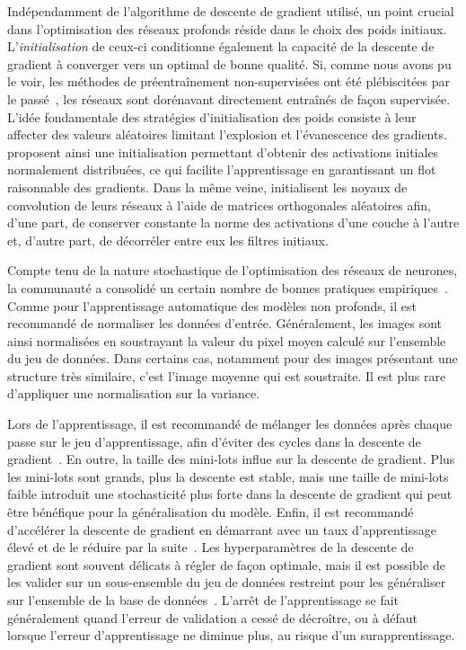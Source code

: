 Indépendamment de l'algorithme de descente de gradient utilisé, un point crucial dans l'optimisation des réseaux profonds réside dans le choix des poids initiaux. L'\emph{initialisation} de ceux-ci conditionne également la capacité de la descente de gradient à converger vers un optimal de bonne qualité. Si, comme nous avons pu le voir, les méthodes de préentraînement non-supervisées ont été plébiscitées par le passé~\cite{hinton_fast_2006,bengio_greedy_2007}, les réseaux sont dorénavant directement entraînés de façon supervisée. L'idée fondamentale des stratégies d'initialisation des poids consiste à leur affecter des valeurs aléatoires limitant l'explosion et l'évanescence des gradients. \citet{glorot_understanding_2010,he_delving_2015} proposent ainsi une initialisation permettant d'obtenir des activations initiales normalement distribuées, ce qui facilite l'apprentissage en garantissant un flot raisonnable des gradients. Dans la même veine, \citet{saxe_exact_2014} initialisent les noyaux de convolution de leurs réseaux à l'aide de matrices orthogonales aléatoires afin, d'une part, de conserver constante la norme des activations d'une couche à l'autre et, d'autre part, de décorréler entre eux les filtres initiaux.

Compte tenu de la nature stochastique de l'optimisation des réseaux de neurones, la communauté a consolidé un certain nombre de bonnes pratiques empiriques~\cite{lecun_efficient_1998,bengio_practical_2012,bottou_stochastic_2012}. Comme pour l'apprentissage automatique des modèles non profonds, il est recommandé de normaliser les données d'entrée. Généralement, les images sont ainsi normalisées en soustrayant la valeur du pixel moyen calculé sur l'ensemble du jeu de données. Dans certains cas, notamment pour des images présentant une structure très similaire, c'est l'image moyenne qui est soustraite. Il est plus rare d'appliquer une normalisation sur la variance.

Lors de l'apprentissage, il est recommandé de mélanger les données après chaque passe sur le jeu d'apprentissage, afin d'éviter des cycles dans la descente de gradient~\cite{lecun_efficient_1998}. En outre, la taille des mini-lots influe sur la descente de gradient. Plus les mini-lots sont grands, plus la descente est stable, mais une taille de mini-lots faible introduit une stochasticité plus forte dans la descente de gradient qui peut être bénéfique pour la généralisation du modèle. Enfin, il est recommandé d'accélérer la descente de gradient en démarrant avec un taux d'apprentissage élevé et de le réduire par la suite~\cite{bengio_practical_2012}. Les hyperparamètres de la descente de gradient sont souvent délicats à régler de façon optimale, mais il est possible de les valider sur un sous-ensemble du jeu de données restreint pour les généraliser sur l'ensemble de la base de données~\cite{bottou_stochastic_2012}. L'arrêt de l'apprentissage se fait généralement quand l'erreur de validation a cessé de décroître, ou à défaut lorsque l'erreur d'apprentissage ne diminue plus, au risque d'un surapprentissage.

